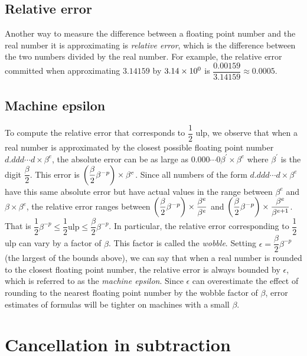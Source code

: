 \subsection{Relative error}

Another way to measure the difference between a floating point number and the
real number it is approximating is \emph{relative error}, which is the
difference between the two numbers divided by the real number. For example,
the relative error committed when approximating $3.14159$ by $3.14 \times  10^{0}  $
is $\dfrac{0.00159}{3.14159} \approx 0.0005$.

\subsection{Machine epsilon}

To compute the relative error that corresponds to $\dfrac{1}{2}$ ulp, we
observe that when a real number is approximated by the closest possible
floating point number $d.ddd \cdots d \times \beta^{e}$, the absolute error
can be as large as $0.000 \cdots 0 \beta^{'}\times\beta^{e}$ where $\beta^{'}$
is the digit $\dfrac{\beta}{2}$. This error is
$\left( \dfrac{\beta}{2}\beta^{-p} \right) \times \beta^{e}$. Since all numbers of
the form $d.ddd \cdots d \times\beta^{e}$ have this same absolute error but
have actual values in the range between $\beta^{e}$ and
$\beta\times\beta^{e}$, the relative error ranges between
$\left( \dfrac{\beta}{2}\beta^{-p} \right)\times\dfrac{\beta^{e}}{\beta^{e}}$ and
$\left( \dfrac{\beta}{2}\beta^{-p} \right)\times\dfrac{\beta^{e}}{\beta^{e+1}}$.
That is $\dfrac{1}{2}\beta^{-p} \leq \dfrac{1}{2} \text{ulp} \leq
\dfrac{\beta}{2}\beta^{-p}$. In particular, the relative error corresponding
to $\dfrac{1}{2}$ ulp can vary by a factor of $\beta$. This factor is called
the \emph{wobble}. Setting $\epsilon=\dfrac{\beta}{2}\beta^{-p}$ (the largest
of the bounds above), we can say that when a real number is rounded to the
closest floating point number, the relative error is always bounded by
$\epsilon$, which is referred to as the \emph{machine epsilon}. Since
$\epsilon$ can overestimate the effect of rounding to the nearest floating
point number by the wobble factor of $\beta$, error estimates of formulas will
be tighter on machines with a small $\beta$.

\section{Cancellation in subtraction}

